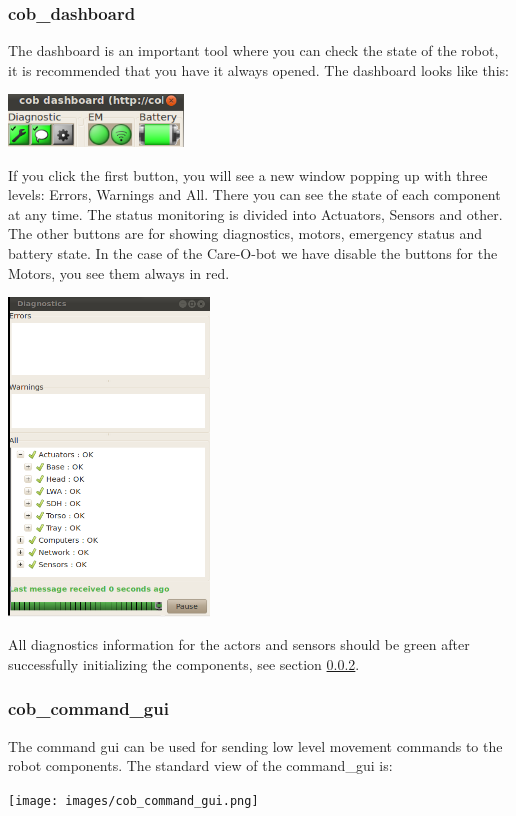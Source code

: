 \subsubsection{cob\_dashboard}\label{subsec:dashboard}
The dashboard is an important tool where you can check the state of the robot, it is recommended that you have it always opened. The dashboard looks like this:

\begin{center}
\includegraphics[width=0.35\textwidth]{images/dashboard.png}
\end{center}
If you click the first button, you will see a new window popping up with three levels: Errors, Warnings and All. There you can see the state of each component at any time. The status monitoring is divided into Actuators, Sensors and other. The other buttons are for showing diagnostics, motors, emergency status and battery state. In the case of the Care-O-bot we have disable the buttons for the Motors, you see them always in red.

\begin{center}
\includegraphics[width=0.4\textwidth]{images/diagnostics.png}
\end{center}

All diagnostics information for the actors and sensors should be green after successfully initializing the components, see section \ref{subsec:command_gui}.

\subsubsection{cob\_command\_gui}\label{subsec:command_gui}
The command gui can be used for sending low level movement commands to the robot components. The standard view of the command\_gui is:
\begin{center}
 \texttt{[image: images/cob\_command\_gui.png]}
\end{center}

